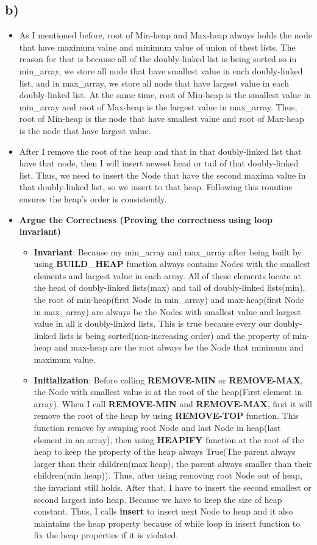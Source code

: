 \documentclass{article}
\begin{document}
	\subsection*{b)}
	\begin{itemize}
		\item As I mentioned before, root of Min-heap and Max-heap always holds the node that have maximum value and minimum value of union of thest lists. The reason for that is because all of the doubly-linked list is being sorted so in min\_array, we store all node that have smallest value in each doubly-linked list, and in max\_array, we store all node that have largest value in each doubly-linked list. At the same time, root of Min-heap is the smallest value in min\_array and root of Max-heap is the largest value in max\_array. Thus, root of Min-heap is the node that have smallest value and root of Max-heap is the node that have largest value.
		\item After I remove the root of the heap and that in that doubly-linked list that have that node, then I will insert newest head or tail of that doubly-linked list. Thus, we need  to insert the Node that have the second maxima value in that doubly-linked list, so we insert to that heap. Following this rountine ensures the heap's order is consistently. 
		\item \textbf{Argue the Correctness (Proving the correctness using loop invariant)}
		\begin{itemize}
			\item \textbf{Invariant}: Because my min\_array and max\_array after being built by using \textbf{BUILD\_HEAP} function always contains Nodes with the smallest elements and largest value in each array. All of these elements locate at the head of doubly-linked lists(max) and tail of doubly-linked lists(min), the root of min-heap(first Node in min\_array) and max-heap(first Node in max\_array) are always be the Nodes with smallest value and largest value in all k doubly-linked lists. This is true because every our doubly-linked lists is being sorted(non-increasing order) and the property of min-heap and max-heap are the root always be the Node that minimum and maximum value.
			\item \textbf{Initialization}: Before calling \textbf{REMOVE-MIN} or \textbf{REMOVE-MAX}, the Node with smallest value is at the root of the heap(First element in array). When I call \textbf{REMOVE-MIN} and \textbf{REMOVE-MAX}, first it will remove the root of the heap by using \textbf{REMOVE-TOP} function. This function remove by swaping root Node and last Node in heap(last element in an array), then using \textbf{HEAPIFY} function at the root of the heap to keep the property of the heap always True(The parent always larger than their children(max heap), the parent always smaller than their children(min heap)). Thus, after using removing root Node out of heap, the invariant still holds. After that, I have to insert the second smallest or second largest into heap. Because we have to keep the size of heap constant. Thus, I calls \textbf{insert} to insert next Node to heap and it also maintains the heap property because of while loop in insert function to fix the heap properties if it is violated.

\end{itemize}
\end{itemize}
\end{document}
